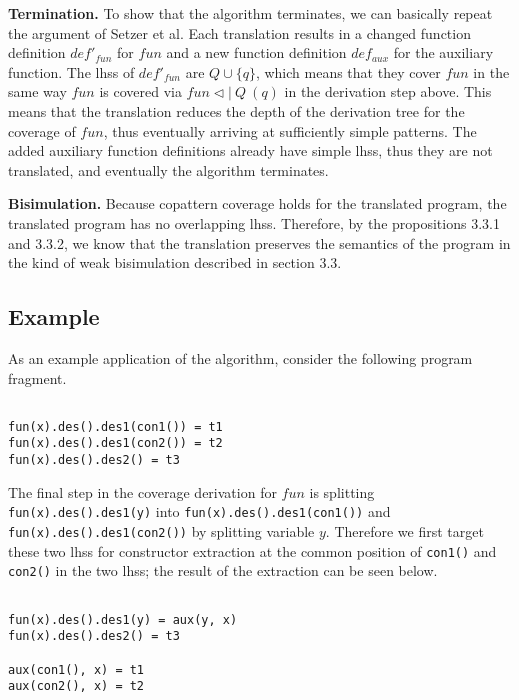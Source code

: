\textbf{Termination.} To show that the algorithm terminates, we can basically repeat the argument of Setzer et al. Each translation results in a changed function definition $def'_{fun}$ for $fun$ and a new function definition $def_{aux}$ for the auxiliary function. The lhss of $def'_{fun}$ are $Q \cup \{q\}$, which means that they cover $fun$ in the same way $fun$ is covered via $fun \lhd | ~ Q ~ (q)$ in the derivation step above. This means that the translation reduces the depth of the derivation tree for the coverage of $fun$, thus eventually arriving at sufficiently simple patterns. The added auxiliary function definitions already have simple lhss, thus they are not translated, and eventually the algorithm terminates.

\textbf{Bisimulation.} Because copattern coverage holds for the translated program, the translated program has no overlapping lhss. Therefore, by the propositions 3.3.1 and 3.3.2, we know that the translation preserves the semantics of the program in the kind of weak bisimulation described in section 3.3.

\subsection{Example}

As an example application of the algorithm, consider the following program fragment.

\begin{lstlisting}

fun(x).des().des1(con1()) = t1
fun(x).des().des1(con2()) = t2
fun(x).des().des2() = t3

\end{lstlisting}

The final step in the coverage derivation for $fun$ is splitting \texttt{fun(x).des().des1(y)} into \texttt{fun(x).des().des1(con1())} and \texttt{fun(x).des().des1(con2())} by splitting variable $y$. Therefore we first target these two lhss for constructor extraction at the common position of \texttt{con1()} and \texttt{con2()} in the two lhss; the result of the extraction can be seen below.

\begin{lstlisting}

fun(x).des().des1(y) = aux(y, x)
fun(x).des().des2() = t3

aux(con1(), x) = t1
aux(con2(), x) = t2

\end{lstlisting}

